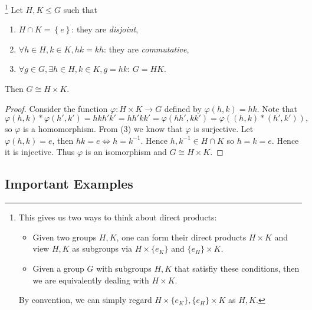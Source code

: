 \documentclass[a4paper]{article}
\begin{document}
    \begin{theorem}\label{thm:Direct Product Theorem}
        \footnote{This gives us two ways to think about direct products:
        \begin{itemize}
            \item Given two groups $H,K$, one can form their direct products $ H \times K $ and view $H,K$ as subgroups via $ H \times \{e_K\} $ and $ \{e_H\}\times K $.
            \item Given a group $G$ with subgroups $H,K$ that satisfiy these conditions, then we are equivalently dealing with $ H \times K $.
        \end{itemize}
        By convention, we can simply regard $ H \times \{e_K\},\{e_H\}\times K $ as $ H,K. $}
        Let $ H,K\le G $ such that
        \begin{enumerate}[(1)]
            \item $ H \cap K=\left\{ e\right\} $: they are \textit{disjoint},
            \item $ \forall h\in H,k\in K, hk=kh $: they are \textit{commutative},
            \item $ \forall g\in G, \exists h\in H, k\in K, g=hk $: $ G=HK $.
        \end{enumerate}
        Then $ G \cong H \times K $.
    \end{theorem}
    \begin{proof}
        Consider the function $ \varphi: H\times K \to G $ defined by $ \varphi(h,k)=hk $. Note that 
        \[
            \varphi(h,k) * \varphi(h',k') = hkh'k'=hh'kk'=\varphi(hh',kk')=\varphi((h,k)*(h',k'))
        ,\]
        so $ \varphi $ is a homomorphism. From (3) we know that $ \varphi $ is surjective. Let $ \varphi(h,k)=e $, then $ hk=e \Leftrightarrow h=k^{-1} $. Hence $ h,k^{-1}\in H \cap K $ so $ h=k=e $. Hence it is injective. Thus $\varphi$ is an isomorphism and $ G \cong H \times K $.
    \end{proof}
    \subsection{Important Examples}
\end{document}
